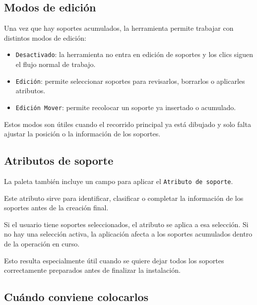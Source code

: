 
\subsection{Modos de edición}

Una vez que hay soportes acumulados, la herramienta permite trabajar con distintos modos de edición:

\begin{itemize}
\item \texttt{Desactivado}: la herramienta no entra en edición de soportes y los clics siguen el flujo normal de trabajo.
\item \texttt{Edición}: permite seleccionar soportes para revisarlos, borrarlos o aplicarles atributos.
\item \texttt{Edición Mover}: permite recolocar un soporte ya insertado o acumulado.
\end{itemize}

Estos modos son útiles cuando el recorrido principal ya está dibujado y solo falta ajustar la posición o la información de los soportes.


\subsection{Atributos de soporte}

La paleta también incluye un campo para aplicar el \texttt{Atributo de soporte}.

Este atributo sirve para identificar, clasificar o completar la información de los soportes antes de la creación final.

Si el usuario tiene soportes seleccionados, el atributo se aplica a esa selección. Si no hay una selección activa, la aplicación afecta a los soportes acumulados dentro de la operación en curso.

Esto resulta especialmente útil cuando se quiere dejar todos los soportes correctamente preparados antes de finalizar la instalación.


\subsection{Cuándo conviene colocarlos}

